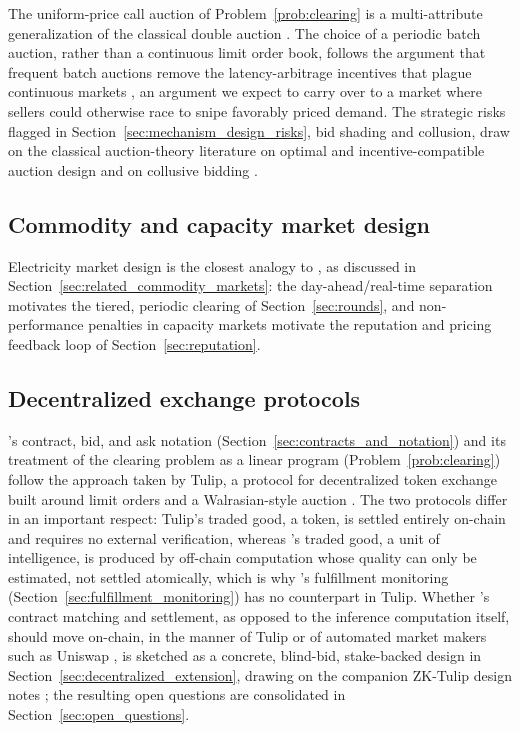 The uniform-price call auction of Problem~\ref{prob:clearing} is a
multi-attribute generalization of the classical double auction
\cite{mcafee1992}. The choice of a periodic batch auction, rather than a
continuous limit order book, follows the argument that frequent batch
auctions remove the latency-arbitrage incentives that plague continuous
markets \cite{budish2015}, an argument we expect to carry over to a
market where sellers could otherwise race to snipe favorably priced
demand. The strategic risks flagged in
Section~\ref{sec:mechanism_design_risks}, bid shading and collusion, draw
on the classical auction-theory literature on optimal and
incentive-compatible auction design \cite{myerson1981} and on collusive
bidding \cite{mcafeemcmillan1992}.

\subsection{Commodity and capacity market design}
\label{sec:related_commodity}

Electricity market design \cite{stoft2002, cramton2017} is the closest
analogy to \Noesis, as discussed in
Section~\ref{sec:related_commodity_markets}: the day-ahead/real-time
separation motivates the tiered, periodic clearing of
Section~\ref{sec:rounds}, and non-performance penalties in capacity
markets \cite{cramtonstoft2005} motivate the reputation and pricing
feedback loop of Section~\ref{sec:reputation}.

\subsection{Decentralized exchange protocols}
\label{sec:related_dex}

\Noesis{}'s contract, bid, and ask notation (Section~\ref{sec:contracts_and_notation})
and its treatment of the clearing problem as a linear program
(Problem~\ref{prob:clearing}) follow the approach taken by Tulip, a
protocol for decentralized token exchange built around limit orders and a
Walrasian-style auction \cite{tulip2023}. The two protocols differ in an
important respect: Tulip's traded good, a token, is settled entirely
on-chain and requires no external verification, whereas \Noesis's traded
good, a unit of intelligence, is produced by off-chain computation whose
quality can only be estimated, not settled atomically, which is why
\NoesisServer's fulfillment monitoring (Section~\ref{sec:fulfillment_monitoring})
has no counterpart in Tulip. Whether \NoesisMarket's contract matching and
settlement, as opposed to the inference computation itself, should move
on-chain, in the manner of Tulip or of automated market makers such as
Uniswap \cite{uniswap2020, angerischitra2020}, is sketched as a concrete,
blind-bid, stake-backed design in Section~\ref{sec:decentralized_extension},
drawing on the companion ZK-Tulip design notes \cite{zktulip2023}; the
resulting open questions are consolidated in
Section~\ref{sec:open_questions}.

